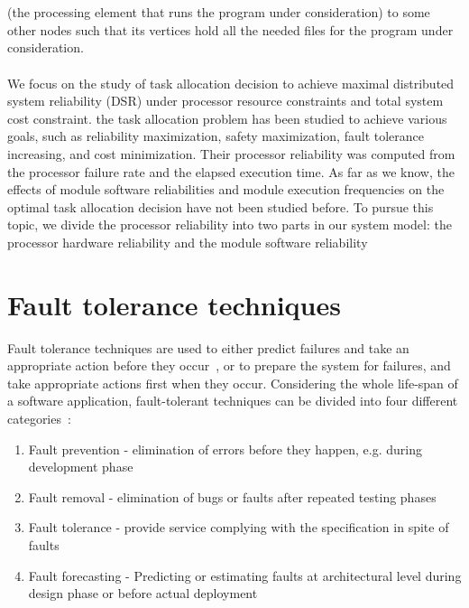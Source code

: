 \documentclass{cslthse-msc}
\begin{document}
\\\\
(the processing element that runs the program under consideration) to some other nodes such that its vertices hold all the needed files for the program under consideration. \cite{relAnalysisFRA}
\\\\
We focus on the study of task allocation decision to achieve maximal distributed system reliability (DSR) under processor resource constraints and total system cost constraint. the task allocation problem has been studied to achieve various goals, such as reliability maximization, safety maximization, fault tolerance increasing, and cost minimization. Their processor reliability was computed from the processor failure rate and the elapsed execution time. As far as we know, the effects of module software reliabilities and module execution frequencies on the optimal task allocation decision have not been studied before. To pursue this topic, we divide the processor reliability into two parts in our system model: the processor hardware reliability and the module software reliability \cite{decisionModelTaskAllocation}
\fi

\section{Fault tolerance techniques} \label{sec:background_fault_tol_tech}
Fault tolerance techniques are used to either predict failures and take an appropriate action before they occur~\cite{faultToleranceChallenges}, or to prepare the system for failures, and take appropriate actions first when they occur. Considering the whole life-span of a software application, fault-tolerant techniques can be divided into four different categories~\cite{surveyReliabilityDistr}:

\begin{enumerate}
\item Fault prevention - elimination of errors before they happen, e.g. during development phase
\item Fault removal - elimination of bugs or faults after repeated testing phases
\item Fault tolerance - provide service complying with the specification in spite of faults
\item Fault forecasting - Predicting or estimating faults at architectural level during design phase or before actual deployment
\end{enumerate}
\end{document}
